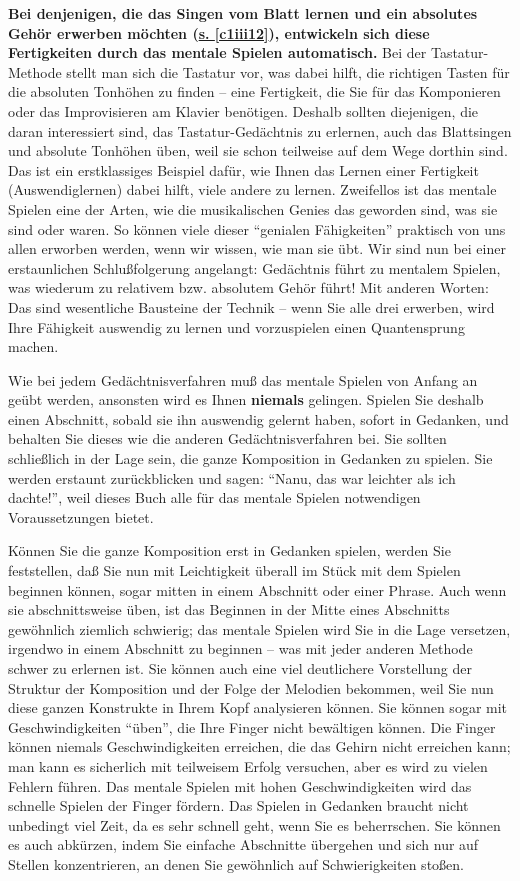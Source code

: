 \textbf{Bei denjenigen, die das Singen vom Blatt lernen und ein absolutes Gehör erwerben möchten (\hyperref[c1iii12]{s. \autoref{c1iii12}}), entwickeln sich diese Fertigkeiten durch das mentale Spielen automatisch.}
Bei der Tastatur-Methode stellt man sich die Tastatur vor, was dabei hilft, die richtigen Tasten für die absoluten Tonhöhen zu finden -- eine Fertigkeit, die Sie für das Komponieren oder das Improvisieren am Klavier benötigen.
Deshalb sollten diejenigen, die daran interessiert sind, das Tastatur-Gedächtnis zu erlernen, auch das Blattsingen und absolute Tonhöhen üben, weil sie schon teilweise auf dem Wege dorthin sind.
Das ist ein erstklassiges Beispiel dafür, wie Ihnen das Lernen einer Fertigkeit (Auswendiglernen) dabei hilft, viele andere zu lernen.
Zweifellos ist das mentale Spielen eine der Arten, wie die musikalischen Genies das geworden sind, was sie sind oder waren.
So können viele dieser \enquote{genialen Fähigkeiten} praktisch von uns allen erworben werden, wenn wir wissen, wie man sie übt.
Wir sind nun bei einer erstaunlichen Schlußfolgerung angelangt: Gedächtnis führt zu mentalem Spielen, was wiederum zu relativem bzw. absolutem Gehör führt!
Mit anderen Worten: Das sind wesentliche Bausteine der Technik -- wenn Sie alle drei erwerben, wird Ihre Fähigkeit auswendig zu lernen und vorzuspielen einen Quantensprung machen.

Wie bei jedem Gedächtnisverfahren muß das mentale Spielen von Anfang an geübt werden, ansonsten wird es Ihnen \textbf{niemals} gelingen.
Spielen Sie deshalb einen Abschnitt, sobald sie ihn auswendig gelernt haben, sofort in Gedanken, und behalten Sie dieses wie die anderen Gedächtnisverfahren bei.
Sie sollten schließlich in der Lage sein, die ganze Komposition in Gedanken zu spielen.
Sie werden erstaunt zurückblicken und sagen: \enquote{Nanu, das war leichter als ich dachte!}, weil dieses Buch alle für das mentale Spielen notwendigen Voraussetzungen bietet.

Können Sie die ganze Komposition erst in Gedanken spielen, werden Sie feststellen, daß Sie nun mit Leichtigkeit überall im Stück mit dem Spielen beginnen können, sogar mitten in einem Abschnitt oder einer Phrase.
Auch wenn sie abschnittsweise üben, ist das Beginnen in der Mitte eines Abschnitts gewöhnlich ziemlich schwierig; das mentale Spielen wird Sie in die Lage versetzen, irgendwo in einem Abschnitt zu beginnen -- was mit jeder anderen Methode schwer zu erlernen ist.
Sie können auch eine viel deutlichere Vorstellung der Struktur der Komposition und der Folge der Melodien bekommen, weil Sie nun diese ganzen Konstrukte in Ihrem Kopf analysieren können.
Sie können sogar mit Geschwindigkeiten \enquote{üben}, die Ihre Finger nicht bewältigen können.
Die Finger können niemals Geschwindigkeiten erreichen, die das Gehirn nicht erreichen kann; man kann es sicherlich mit teilweisem Erfolg versuchen, aber es wird zu vielen Fehlern führen.
Das mentale Spielen mit hohen Geschwindigkeiten wird das schnelle Spielen der Finger fördern.
Das Spielen in Gedanken braucht nicht unbedingt viel Zeit, da es sehr schnell geht, wenn Sie es beherrschen.
Sie können es auch abkürzen, indem Sie einfache Abschnitte übergehen und sich nur auf Stellen konzentrieren, an denen Sie gewöhnlich auf Schwierigkeiten stoßen.

